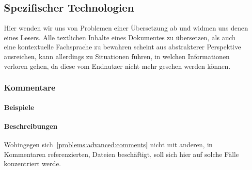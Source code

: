 {\begin{comment}


\end{comment}

\subsection{Spezifischer Technologien}\label{problems:special}%
Hier wenden wir uns von Problemen einer Übersetzung ab und widmen uns denen eines Lesers. Alle textlichen Inhalte eines Dokumentes zu übersetzen, als auch eine kontextuelle Fachsprache zu bewahren scheint aus abstrakterer Perspektive ausreichen, kann allerdings zu Situationen führen, in welchen Informationen verloren gehen, da diese vom Endnutzer nicht mehr gesehen werden können.%



\subsubsection{Kommentare}\label{problems:advanced:comments}
\paragraph*{Beispiele}
\paragraph*{Beschreibungen}
Wohingegen sich~\ref{problems:advanced:comments} nicht mit anderen, in Kommentaren referenzierten, Dateien beschäftigt, soll sich hier auf solche Fälle konzentriert werde.
}
